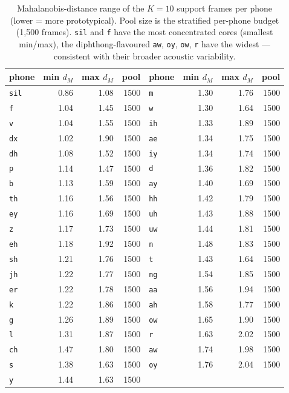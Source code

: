 \documentclass[11pt]{article}
\begin{document}
\begin{table}[H]
\centering
\caption{Mahalanobis-distance range of the $K = 10$ support frames per phone (lower = more prototypical). Pool size is the stratified per-phone budget (1{,}500 frames). \texttt{sil} and \texttt{f} have the most concentrated cores (smallest min/max), the diphthong-flavoured \texttt{aw}, \texttt{oy}, \texttt{ow}, \texttt{r} have the widest --- consistent with their broader acoustic variability.}
\begin{tabular}{lrrrlrrr}
\toprule
phone & min $d_M$ & max $d_M$ & pool & phone & min $d_M$ & max $d_M$ & pool \\
\midrule
\texttt{sil} & 0.86 & 1.08 & 1500 & \texttt{m}  & 1.30 & 1.76 & 1500 \\
\texttt{f}   & 1.04 & 1.45 & 1500 & \texttt{w}  & 1.30 & 1.64 & 1500 \\
\texttt{v}   & 1.04 & 1.55 & 1500 & \texttt{ih} & 1.33 & 1.89 & 1500 \\
\texttt{dx}  & 1.02 & 1.90 & 1500 & \texttt{ae} & 1.34 & 1.75 & 1500 \\
\texttt{dh}  & 1.08 & 1.52 & 1500 & \texttt{iy} & 1.34 & 1.74 & 1500 \\
\texttt{p}   & 1.14 & 1.47 & 1500 & \texttt{d}  & 1.36 & 1.82 & 1500 \\
\texttt{b}   & 1.13 & 1.59 & 1500 & \texttt{ay} & 1.40 & 1.69 & 1500 \\
\texttt{th}  & 1.16 & 1.56 & 1500 & \texttt{hh} & 1.42 & 1.79 & 1500 \\
\texttt{ey}  & 1.16 & 1.69 & 1500 & \texttt{uh} & 1.43 & 1.88 & 1500 \\
\texttt{z}   & 1.17 & 1.73 & 1500 & \texttt{uw} & 1.44 & 1.81 & 1500 \\
\texttt{eh}  & 1.18 & 1.92 & 1500 & \texttt{n}  & 1.48 & 1.83 & 1500 \\
\texttt{sh}  & 1.21 & 1.76 & 1500 & \texttt{t}  & 1.43 & 1.64 & 1500 \\
\texttt{jh}  & 1.22 & 1.77 & 1500 & \texttt{ng} & 1.54 & 1.85 & 1500 \\
\texttt{er}  & 1.22 & 1.78 & 1500 & \texttt{aa} & 1.56 & 1.94 & 1500 \\
\texttt{k}   & 1.22 & 1.86 & 1500 & \texttt{ah} & 1.58 & 1.77 & 1500 \\
\texttt{g}   & 1.26 & 1.89 & 1500 & \texttt{ow} & 1.65 & 1.90 & 1500 \\
\texttt{l}   & 1.31 & 1.87 & 1500 & \texttt{r}  & 1.63 & 2.02 & 1500 \\
\texttt{ch}  & 1.47 & 1.80 & 1500 & \texttt{aw} & 1.74 & 1.98 & 1500 \\
\texttt{s}   & 1.38 & 1.63 & 1500 & \texttt{oy} & 1.76 & 2.04 & 1500 \\
\texttt{y}   & 1.44 & 1.63 & 1500 &              &      &      &      \\
\bottomrule
\end{tabular}
\end{table}
\end{document}
